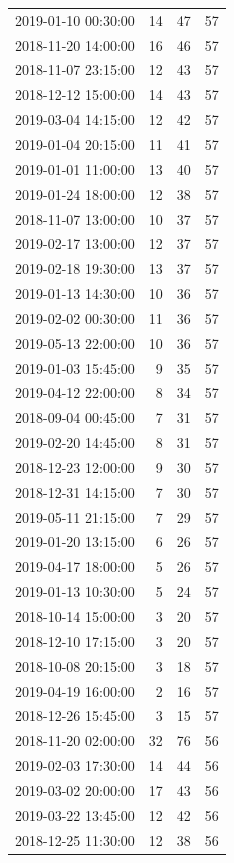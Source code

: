\begin{tabular}{lrrr}
2019-01-10 00:30:00 & 14 & 47 & 57 \\
2018-11-20 14:00:00 & 16 & 46 & 57 \\
2018-11-07 23:15:00 & 12 & 43 & 57 \\
2018-12-12 15:00:00 & 14 & 43 & 57 \\
2019-03-04 14:15:00 & 12 & 42 & 57 \\
2019-01-04 20:15:00 & 11 & 41 & 57 \\
2019-01-01 11:00:00 & 13 & 40 & 57 \\
2019-01-24 18:00:00 & 12 & 38 & 57 \\
2018-11-07 13:00:00 & 10 & 37 & 57 \\
2019-02-17 13:00:00 & 12 & 37 & 57 \\
2019-02-18 19:30:00 & 13 & 37 & 57 \\
2019-01-13 14:30:00 & 10 & 36 & 57 \\
2019-02-02 00:30:00 & 11 & 36 & 57 \\
2019-05-13 22:00:00 & 10 & 36 & 57 \\
2019-01-03 15:45:00 & 9 & 35 & 57 \\
2019-04-12 22:00:00 & 8 & 34 & 57 \\
2018-09-04 00:45:00 & 7 & 31 & 57 \\
2019-02-20 14:45:00 & 8 & 31 & 57 \\
2018-12-23 12:00:00 & 9 & 30 & 57 \\
2018-12-31 14:15:00 & 7 & 30 & 57 \\
2019-05-11 21:15:00 & 7 & 29 & 57 \\
2019-01-20 13:15:00 & 6 & 26 & 57 \\
2019-04-17 18:00:00 & 5 & 26 & 57 \\
2019-01-13 10:30:00 & 5 & 24 & 57 \\
2018-10-14 15:00:00 & 3 & 20 & 57 \\
2018-12-10 17:15:00 & 3 & 20 & 57 \\
2018-10-08 20:15:00 & 3 & 18 & 57 \\
2019-04-19 16:00:00 & 2 & 16 & 57 \\
2018-12-26 15:45:00 & 3 & 15 & 57 \\
2018-11-20 02:00:00 & 32 & 76 & 56 \\
2019-02-03 17:30:00 & 14 & 44 & 56 \\
2019-03-02 20:00:00 & 17 & 43 & 56 \\
2019-03-22 13:45:00 & 12 & 42 & 56 \\
2018-12-25 11:30:00 & 12 & 38 & 56 \\

\end{tabular}

